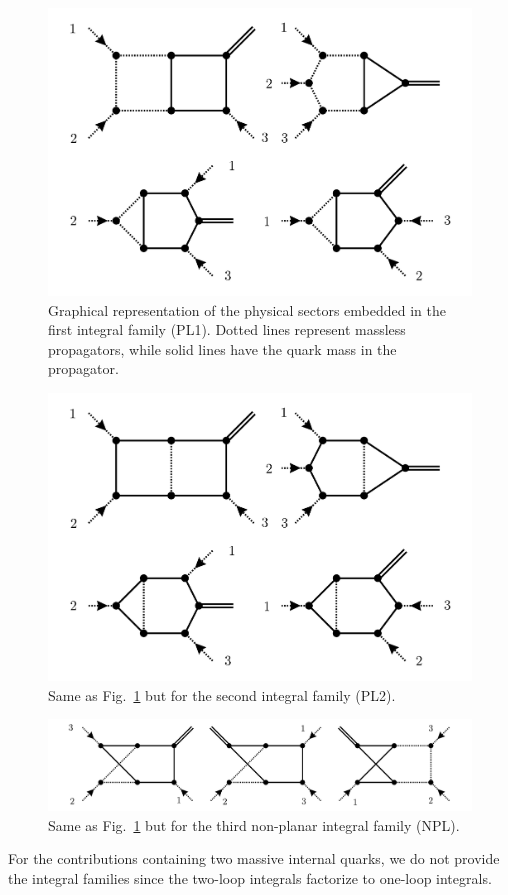 \begin{figure}[h]
\centering
\includegraphics[scale=0.3]{Images/NNLO_Feynman_diagrams/PL1.pdf}
\caption{Graphical representation of the physical sectors embedded in the first integral family (PL1). Dotted lines represent massless propagators, while solid lines have the quark mass in the propagator.} \label{fig:5:PL1}
\end{figure}
\begin{figure}[h]
\centering
\includegraphics[scale=0.3]{Images/NNLO_Feynman_diagrams/PL2.pdf}
\caption{Same as Fig.~\ref{fig:5:PL1} but for the second integral family (PL2).} \label{fig:5:PL2}
\end{figure}
\begin{figure}[h]
\centering
\includegraphics[scale=0.4]{Images/NNLO_Feynman_diagrams/NPL.pdf}
\caption{Same as Fig.~\ref{fig:5:PL1} but for the third non-planar integral family (NPL).} \label{fig:5:NPL}
\end{figure}
For the contributions containing two massive internal quarks, we do not provide the integral families since the two-loop integrals factorize to one-loop integrals.

